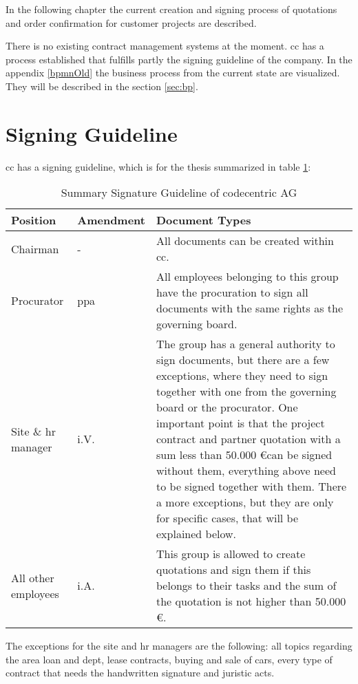 In the following chapter the current creation and signing process of quotations and order confirmation for customer projects are described.

There is no existing contract management systems at the moment. \Gls{cc} has a process established that fulfills partly the signing guideline of the company. In the appendix \ref{bpmnOld} the business process from the current state are visualized. They will be described in the section \ref{sec:bp}.

\section{Signing Guideline} \label{sec:signingGuideline}

\Gls{cc} has a signing guideline, which is for the thesis summarized in table \ref{tab:summarySignatureGuideline}:
\begin{table}[h!]
	\begin{tabular}{|p{3cm}|p{2cm}|p{10cm}|}\hline
		\rowcolor{Gray}Position & Amendment & Document Types \\ \hline
		Chairman & - & All documents can be created within \gls{cc}. \\ \hline
		Procurator & ppa & All employees belonging to this group have the procuration to sign all documents with the same rights as the governing board.\\ \hline
		Site \& \gls{hr} manager & i.V. & The group has a general authority to sign documents, but there are a few exceptions, where they need to sign together with one from the governing board or the procurator. One important point is that the project contract and partner quotation with a sum less than 50.000 \euro can be signed without them, everything above need to be signed together with them. There a more exceptions, but they are only for specific cases, that will be explained below. \\ \hline
		All other employees & i.A. & This group is allowed to create quotations and sign them if this belongs to their tasks and the sum of the quotation is not higher than 50.000 \euro. \\ \hline
	\end{tabular}
	\caption{Summary Signature Guideline of codecentric AG}
	\label{tab:summarySignatureGuideline}
\end{table}

The exceptions for the site and \gls{hr} managers are the following: all topics regarding the area loan and dept, lease contracts, buying and sale of cars, every type of contract that needs the handwritten signature and juristic acts.

